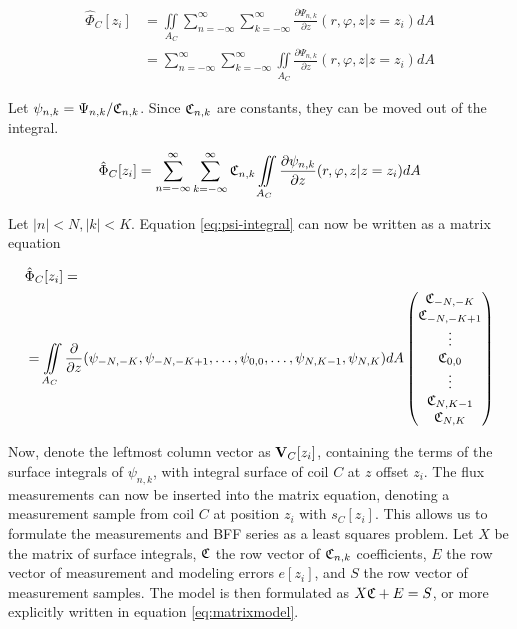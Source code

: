 \begin{equation}
    \begin{split}
        \hat{\Phi}_C[z_i] &=
        \iint\limits_{A_C}
        \sum\limits_{n=-\infty}^{\infty}
        \sum\limits_{k=-\infty}^{\infty}
        \frac{\partial \Psi_{n,k}}{\partial z}
        (r,\varphi, z|z=z_i) dA \\
        &= \sum\limits_{n=-\infty}^{\infty}
        \sum\limits_{k=-\infty}^{\infty}
        \iint\limits_{A_C}
        \frac{\partial \Psi_{n,k}}{\partial z}
        (r,\varphi, z|z=z_i)dA
    \end{split}
\end{equation}

Let $\psi_{n,k} = \Psi_{n,k}/\Cnk[n,k]$. Since $\Cnk[n,k]$ are
constants, they can be moved out of the integral.

\begin{equation}
    \hat{\Phi}_C[z_i]
    = \sum\limits_{n=-\infty}^{\infty}
    \sum\limits_{k=-\infty}^{\infty}
    \Cnk
    \iint\limits_{A_C}
    \frac{\partial \psi_{n,k}}{\partial z}
    (r,\varphi, z|z=z_i)dA
    \label{eq:psi-integral}
\end{equation}

Let $|n| < N, |k| < K$.
Equation \ref{eq:psi-integral} can now be
written as a matrix equation

\begin{equation}
    \begin{split}
        &\hat{\Phi}_C[z_i] = \\
        &=\iint\limits_{A_C}
        \frac{\partial}{\partial z}
        (\psi_{-N, -K}, \psi_{-N, -K+1}, \ldots,
        \psi_{0, 0}, \ldots, \psi_{N, K-1}, \psi_{N, K})
        dA
        \begin{pmatrix}
            \Cnk[-N, -K] \\ \Cnk[-N, -K+1]\\ \vdots\\
            \Cnk[0, 0]   \\ \vdots \\ \Cnk[N, K-1]\\ \Cnk[N, K]
        \end{pmatrix}
    \end{split}
\end{equation}

Now, denote the leftmost column vector as $\vb{V}_C[z_i]$,
containing the terms of the surface integrals of $\psi_{n,k}$,
with integral surface of coil $C$ at $z$ offset $z_i$. The flux
measurements can now be inserted into the matrix equation, denoting
a measurement sample from coil $C$ at position $z_i$ with $s_C[z_i]$.
This allows us to formulate the measurements and BFF series as
a least squares problem. Let $X$ be the matrix of surface
integrals, $\frak{C}$ the row vector of $\Cnk$ coefficients,
$E$ the row vector of measurement and modeling errors $e[z_i]$, and
$S$ the row vector of measurement samples. The model is then
formulated as $X\frak{C} + E = S$, or more explicitly written
in equation \ref{eq:matrixmodel}.


